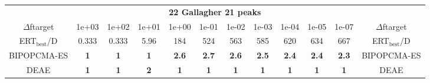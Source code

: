 \begin{tabular}{cccccccccccc}
 & \multicolumn{10}{c}{{\normalsize \textbf{22 Gallagher 21 peaks}}}\\
$\Delta$ftarget& 1e+03& 1e+02& 1e+01& 1e+00& 1e-01& 1e-02& 1e-03& 1e-04& 1e-05& 1e-07 & $\Delta$ftarget \\
ERT$_{\textrm{best}}$/D& 0.333& 0.333& 5.96& 184& 524& 563& 585& 620& 634& 667 & ERT$_{\textrm{best}}$/D \\
\hline
BIPOPCMA-ES & \textbf{1} & \textbf{1} & \textbf{1} & \textbf{2.6} & \textbf{2.7} & \textbf{2.6} & \textbf{2.5} & \textbf{2.4} & \textbf{2.4} & \textbf{2.3} & BIPOPCMA-ES \cite{add_an_entry_for_BIPOPCMA-ES_in_bbob.bib}\\
DEAE & \textbf{1} & \textbf{1} & \textbf{2} & \textbf{1} & \textbf{1} & \textbf{1} & \textbf{1} & \textbf{1} & \textbf{1} & \textbf{1} & DEAE \cite{add_an_entry_for_DEAE_in_bbob.bib}
\end{tabular}
